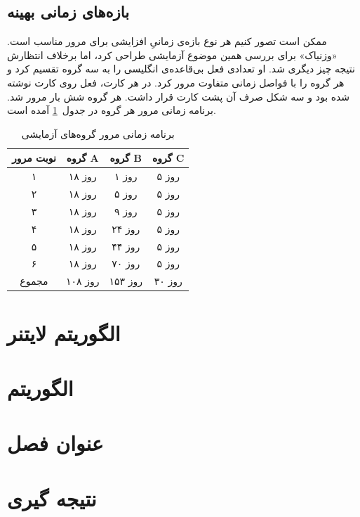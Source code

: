 \documentclass[12pt]{report}
\begin{document}
\section{بازه‌های زمانی بهینه}

ممکن است تصور کنیم هر نوع بازه‌ی زمانیِ افزایشی برای مرور مناسب است. 
«وزنیاک» برای بررسی همین موضوع آزمایشی طراحی کرد، اما برخلاف انتظارش نتیجه چیز دیگری شد.
او تعدادی فعل بی‌قاعده‌ی انگلیسی را به سه گروه تقسیم کرد و هر گروه را با فواصل زمانی متفاوت مرور کرد.
 در هر کارت، فعل روی کارت نوشته شده بود و سه شکل صرف آن پشت کارت قرار داشت.
هر گروه شش بار مرور شد.
برنامه زمانی مرور هر گروه در جدول~\ref{tbl:repetition_schedule} آمده است.


\begin{table}[h!]
    \centering
    \caption{برنامه زمانی مرور گروه‌های آزمایشی}
    \label{tbl:repetition_schedule}
    \begin{tabular}{|c|c|c|c|}
        \hline
        نوبت مرور & گروه A & گروه B & گروه C \\
        \hline
        ۱ & ۱۸ روز & ۱ روز & ۵ روز \\
        \hline
        ۲ & ۱۸ روز & ۵ روز & ۵ روز \\
        \hline
        ۳ & ۱۸ روز & ۹ روز & ۵ روز \\
        \hline
        ۴ & ۱۸ روز & ۲۴ روز & ۵ روز \\
        \hline
        ۵ & ۱۸ روز & ۴۴ روز & ۵ روز \\
        \hline
        ۶ & ۱۸ روز & ۷۰ روز & ۵ روز \\
        \hline
        مجموع & ۱۰۸ روز & ۱۵۳ روز & ۳۰ روز \\
        \hline
    \end{tabular}
\end{table}

\chapter{الگوریتم لایتنر}

\chapter{الگوریتم }

\chapter{عنوان فصل}

\chapter{نتیجه گیری}
\end{document}

